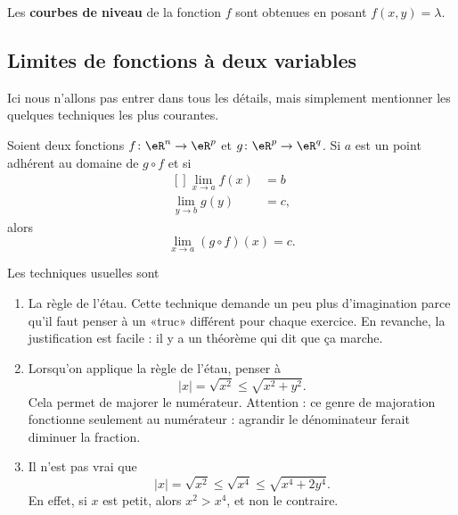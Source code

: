 Les \textbf{courbes de niveau} de la fonction $f$ sont obtenues en posant $f(x,y)=\lambda$.

\subsection{Limites de fonctions à deux variables}

Ici nous n'allons pas entrer dans tous les détails, mais simplement mentionner les quelques techniques les plus courantes.

\begin{theorem}		\label{ThoLimiteCompose}
	Soient deux fonctions $f\colon \eR^n\to \eR^p$ et $g\colon \eR^p\to \eR^q$. Si $a$ est un point adhérent au domaine de $g\circ f$ et si
	\begin{equation}
		\begin{aligned}[]
			\lim_{x\to a}f(x)&=b\\
			\lim_{y\to b}g(y)&=c,
		\end{aligned}
	\end{equation}
	alors
	\begin{equation}
		\lim_{x\to a}(g\circ f)(x)=c.
	\end{equation}
\end{theorem}

Les techniques usuelles sont
\begin{enumerate}

	\item
		La règle de l'étau. Cette technique demande un peu plus d'imagination parce qu'il faut penser à un «truc» différent pour chaque exercice. En revanche, la justification est facile : il y a un théorème qui dit que ça marche.

	\item
		Lorsqu'on applique la règle de l'étau, penser à
		\begin{equation}
			| x |=\sqrt{x^2}\leq\sqrt{x^2+y^2}.
		\end{equation}
		Cela permet de majorer le numérateur. Attention : ce genre de majoration fonctionne seulement au numérateur : agrandir le dénominateur ferait diminuer la fraction.

	\item
		Il n'est pas vrai que
		\begin{equation}
			| x |=\sqrt{x^2}\leq\sqrt{x^4}\leq\sqrt{x^4+2y^4}.
		\end{equation}
		En effet, si $x$ est petit, alors $x^2>x^4$, et non le contraire.

\end{enumerate}


